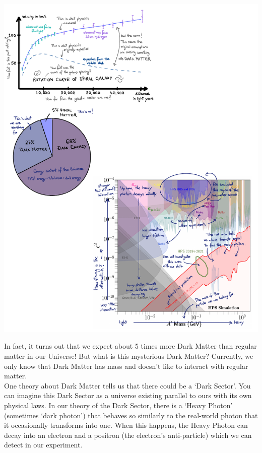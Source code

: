 \begin{poster}
{\begin{minipage}{0.56\columnwidth}
			\end{minipage}
			\begin{minipage}{0.44\columnwidth}
				\centering
				\includegraphics[width=0.7\columnwidth]{figs/pieUniverse.pdf}
			\end{minipage}
			\hspace{0.01\columnwidth}%
			\begin{minipage}{0.56\columnwidth}
				In fact, it turns out that we expect about 5 times more Dark Matter than regular matter in our Universe! But what is this mysterious Dark Matter? Currently, we only know that Dark Matter has mass and doesn't like to interact with regular matter.\\
				One theory about Dark Matter tells us that there could be a `Dark Sector'. You can imagine this Dark Sector as a universe existing parallel to ours with its own physical laws. In our theory of the Dark Sector, there is a `Heavy Photon' (sometimes `dark photon') that behaves so similarly to the real-world photon that it occasionally transforms into one. When this happens, the Heavy Photon can decay into an electron and a positron (the electron's anti-particle) which we can detect in our experiment.
			\end{minipage}
		}


\end{poster}
